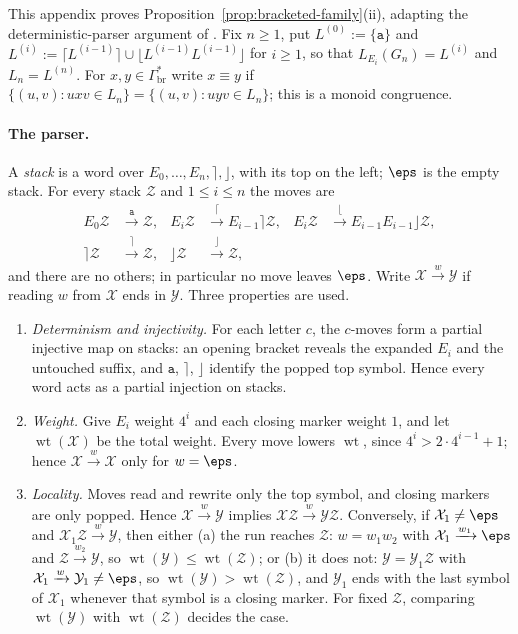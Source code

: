 This appendix proves Proposition~\ref{prop:bracketed-family}(ii), adapting
the deterministic-parser argument of \cite{kuriyamaCFG}. Fix $n\ge1$, put
$L^{(0)}:=\{\mathtt a\}$ and
$L^{(i)}:=\lceil L^{(i-1)}\rceil\cup\lfloor L^{(i-1)}L^{(i-1)}\rfloor$ for
$i\ge1$, so that $L_{E_i}(G_n)=L^{(i)}$ and $L_n=L^{(n)}$. For
$x,y\in\Gamma_{\mathrm{br}}^*$ write $x\equiv y$ if
$\{(u,v):uxv\in L_n\}=\{(u,v):uyv\in L_n\}$; this is a monoid congruence.

\paragraph{The parser.}
A \emph{stack} is a word over $E_0,\ldots,E_n,\rceil,\rfloor$, with its
top on the left; $\eps$ is the empty stack. For every stack $\mathcal Z$ and
$1\le i\le n$ the moves are
\[
\begin{aligned}
E_0\mathcal Z&\xrightarrow{\mathtt a}\mathcal Z,&
E_i\mathcal Z&\xrightarrow{\lceil}E_{i-1}\rceil\mathcal Z,&
E_i\mathcal Z&\xrightarrow{\lfloor}E_{i-1}E_{i-1}\rfloor\mathcal Z,\\
\rceil\mathcal Z&\xrightarrow{\rceil}\mathcal Z,&
\rfloor\mathcal Z&\xrightarrow{\rfloor}\mathcal Z,
\end{aligned}
\]
and there are no others; in particular no move leaves $\eps$. Write
$\mathcal X\xrightarrow{w}\mathcal Y$ if reading $w$ from $\mathcal X$ ends in
$\mathcal Y$. Three properties are used.
\begin{enumerate}[label=\textup{(P\arabic*)},leftmargin=2.6em]
\item \emph{Determinism and injectivity.} For each letter $c$, the
$c$-moves form a partial injective map on stacks: an opening bracket
reveals the expanded $E_i$ and the untouched suffix, and $\mathtt a$,
$\rceil$, $\rfloor$ identify the popped top symbol. Hence every word acts
as a partial injection on stacks.
\item \emph{Weight.} Give $E_i$ weight $4^i$ and each closing marker
weight $1$, and let $\operatorname{wt}(\mathcal X)$ be the total weight. Every
move lowers $\operatorname{wt}$, since $4^i>2\cdot4^{i-1}+1$; hence
$\mathcal X\xrightarrow{w}\mathcal X$ only for $w=\eps$.
\item \emph{Locality.} Moves read and rewrite only the top symbol, and
closing markers are only popped. Hence $\mathcal X\xrightarrow{w}\mathcal Y$
implies $\mathcal X\mathcal Z\xrightarrow{w}\mathcal Y\mathcal Z$. Conversely, if
$\mathcal X_1\ne\eps$ and $\mathcal X_1\mathcal Z\xrightarrow{w}\mathcal Y$, then either
\textup{(a)} the run reaches $\mathcal Z$: $w=w_1w_2$ with
$\mathcal X_1\xrightarrow{w_1}\eps$ and $\mathcal Z\xrightarrow{w_2}\mathcal Y$, so
$\operatorname{wt}(\mathcal Y)\le\operatorname{wt}(\mathcal Z)$; or \textup{(b)} it
does not: $\mathcal Y=\mathcal Y_1\mathcal Z$ with $\mathcal X_1\xrightarrow{w}\mathcal Y_1\ne\eps$,
so $\operatorname{wt}(\mathcal Y)>\operatorname{wt}(\mathcal Z)$, and $\mathcal Y_1$
ends with the last symbol of $\mathcal X_1$ whenever that symbol is a closing
marker. For fixed $\mathcal Z$, comparing $\operatorname{wt}(\mathcal Y)$ with
$\operatorname{wt}(\mathcal Z)$ decides the case.
\end{enumerate}


